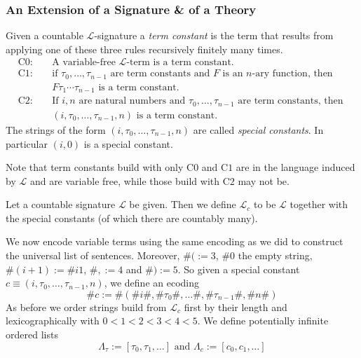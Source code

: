\subsubsection{An Extension of a Signature \& of a Theory}
\begin{definition}
    Given a countable $\mathcal{L}$-signature a \emph{term constant} is the term that results from applying one of these three rules recursively finitely many times.
    \begin{align*}
    \mathrm{C0}\colon\quad & \text{A variable-free } \mathcal{L}\text{-term is a term constant}.\\
    \mathrm{C1}\colon\quad & \text{if } \tau_0,\dots,\tau_{n-1} \text{ are term constants and } F \text{ is an } n \text{-ary function, then}\\ 
    & F\tau_1\cdots\tau_{n-1} \text{ is a term constant}.\\
    \mathrm{C2}\colon\quad & \text{If } i,n \text{ are natural numbers and }\tau_0,\dots,\tau_{n-1} \text{ are term constants, then }\\ 
    &(i,\tau_0,\dots,\tau_{n-1},n) \text{ is a term constant.} 
\end{align*}
The strings of the form $(i,\tau_0,\dots,\tau_{n-1},n)$ are called \emph{special constants}. In particular $(i,0)$ is a special constant. 
\end{definition}
\begin{remark}
    Note that term constants build with only $\mathrm{C0}$ and $\mathrm{C1}$ are in the language induced by $\mathcal{L}$ and are variable free, while those build with $\mathrm{C2}$ may not be.
\end{remark}
\begin{definition}
    Let a countable signature $\mathcal{L}$ be given. Then we define $\mathcal{L}_c$ to be $\mathcal{L}$ together with the special constants (of which there are countably many). 
\end{definition}
We now encode variable terms using the same encoding as we did to construct the universal list of sentences. Moreover, $\#( := 3$, $\#0$ the empty string, $\#(i+1):=\#i1$, $\#,:=4$ and $\#):= 5$. So given a special constant $c \equiv (i,\tau_0,\dots,\tau_{n-1},n)$, we define an ecoding
$$\#c := \#(\#i\#,\#\tau_0\#,\dots \#,\#\tau_{n-1}\#,\#n\#)$$
As before we order strings build from $\mathcal{L}_c$ first by their length and lexicographically with $0<1<2<3<4<5$. We define potentially infinite ordered lists 
$$
    \Lambda_\tau := [\tau_0,\tau_1,\dots] \text{ and } \Lambda_c := [c_0,c_1,\dots]
$$  
